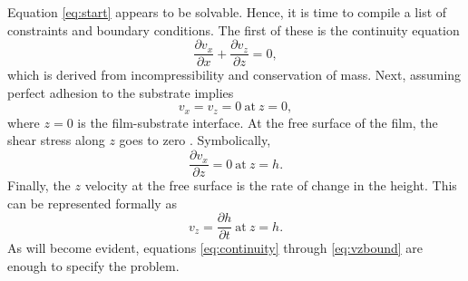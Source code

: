 \documentclass[twocolumn,showpacs,preprintnumbers,amsmath,amssymb]{revtex4}
\begin{document}
Equation \ref{eq:start} appears to be solvable. Hence, it is time to compile a list of
constraints and boundary conditions. The first of these is the continuity equation
\begin{equation}
\frac{\partial v_x}{\partial x}+\frac{\partial v_z}{\partial z} =0 \mathrm{,}
\label{eq:continuity}
\end{equation}
which is derived from incompressibility and conservation of mass. Next, assuming perfect
adhesion to the substrate implies
\begin{equation}
v_x=v_z=0 \mathrm{\ at\ } z=0 \mathrm{,} \label{eq:substrate}
\end{equation}
where $z=0$ is the film-substrate interface. At the free surface of the film, the shear
stress along $z$ goes to zero \cite{levich, barrett}. Symbolically,
\begin{equation}
\frac{\partial v_x}{\partial z}=0 \mathrm{\ at\ } z=h \mathrm{.} \label{eq:shear}
\end{equation}
Finally, the $z$ velocity at the free surface is the rate of change in the height. This
can be represented formally as
\begin{equation}
v_z=\frac{\partial h}{\partial t} \mathrm{\ at\ } z=h \mathrm{.} \label{eq:vzbound}
\end{equation}
As will become evident, equations \ref{eq:continuity} through \ref{eq:vzbound} are enough
to specify the problem.
\end{document}
